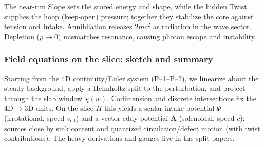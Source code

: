 The near-rim Slope sets the stored energy and shape, while the hidden Twist supplies the hoop (keep-open) pressure; together they stabilize the core against tension and Intake. Annihilation releases $2mc^2$ as radiation in the wave sector. Depletion ($\rho \to 0$) mismatches resonance, causing photon escape and instability.

\subsubsection{Field equations on the slice: sketch and summary}
\label{sec:field-eqs-framework}

Starting from the 4D continuity/Euler system (P–1–P–2), we linearize about the steady background, apply a Helmholtz split to the perturbation, and project through the slab window $\chi(w)$. Codimension and discrete intersections fix the 4D$\!\to$3D units. On the slice $\Pi$ this yields a scalar intake potential $\Psi$ (irrotational, speed $v_{\text{eff}}$) and a vector eddy potential $\mathbf A$ (solenoidal, speed $c$); sources close by sink content and quantized circulation/defect motion (with twist contributions). The heavy derivations and gauges live in the split papers.

